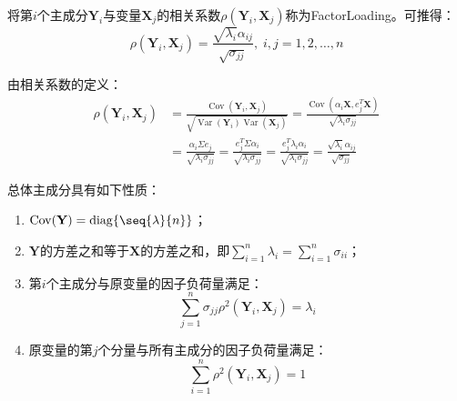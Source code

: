 \begin{definition}
	将第$i$个主成分$\mathbf{Y}_i$与变量$\mathbf{X}_j$的相关系数$\rho(\mathbf{Y}_i,\mathbf{X}_j)$称为\gls{FactorLoading}。可推得：
	\begin{equation*}
		\rho(\mathbf{Y}_i,\mathbf{X}_j)=\frac{\sqrt{\lambda_i}\alpha_{ij}}{\sqrt{\sigma_{jj}}},\;i,j=1,2,\dots,n
	\end{equation*}
\end{definition}
\begin{derivation}\label{der:FactorLoading}
	由相关系数的定义：
	\begin{align*}
		\rho(\mathbf{Y}_i,\mathbf{X}_j)
		&=\frac{\operatorname{Cov}(\mathbf{Y}_i,\mathbf{X}_j)}{\sqrt{\operatorname{Var}(\mathbf{Y}_i)\operatorname{Var}(\mathbf{X}_j)}}=\frac{\operatorname{Cov}(\alpha_i\mathbf{X},e_j^T\mathbf{X})}{\sqrt{\lambda_i\sigma_{jj}}} \\
		&=\frac{\alpha_i\Sigma e_j}{\sqrt{\lambda_i\sigma_{jj}}}=\frac{e_j^T\Sigma\alpha_i}{\sqrt{\lambda_i\sigma_{jj}}}=\frac{e_j^T\lambda_i\alpha_i}{\sqrt{\lambda_i\sigma_{jj}}}=\frac{\sqrt{\lambda_i}\alpha_{ij}}{\sqrt{\sigma_{jj}}}
	\end{align*}
\end{derivation}
\begin{property}
	总体主成分具有如下性质：
	\begin{enumerate}
		\item $\operatorname{Cov}(\mathbf{Y})=\operatorname{diag}\{\seq{\lambda}{n}\}$；
		\item $\mathbf{Y}$的方差之和等于$\mathbf{X}$的方差之和，即$\sum\limits_{i=1}^{n}\lambda_i=\sum\limits_{i=1}^{n}\sigma_{ii}$；
		\item 第$i$个主成分与原变量的因子负荷量满足：
		\begin{equation*}
			\sum_{j=1}^{n}\sigma_{jj}\rho^2(\mathbf{Y}_i,\mathbf{X}_j)=\lambda_i
		\end{equation*}
		\item 原变量的第$j$个分量与所有主成分的因子负荷量满足：
		\begin{equation*}
			\sum_{i=1}^{n}\rho^2(\mathbf{Y}_i,\mathbf{X}_j)=1
		\end{equation*}
	\end{enumerate}
\end{property}
